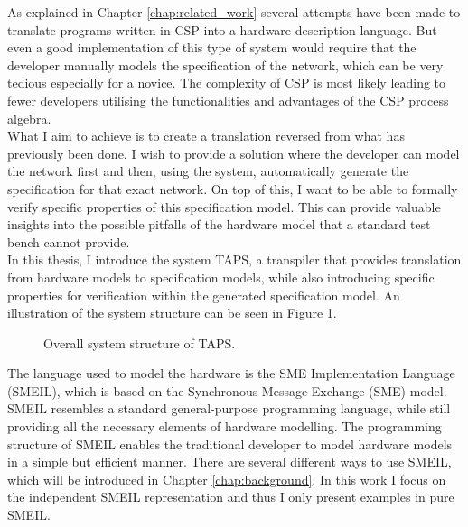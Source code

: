 As explained in Chapter \ref{chap:related_work} several attempts have been made to translate programs written in CSP into a hardware description language. But even a good implementation of this type of system would require that the developer manually models the specification of the \cspm{} network, which can be very tedious especially for a novice.
The complexity of CSP is most likely leading to fewer developers utilising the functionalities and advantages of the CSP process algebra.\\

What I aim to achieve is to create a translation reversed from what has previously been done. I wish to provide a solution where the developer can model the network first and then, using the system, automatically generate the specification for that exact network. On top of this, I want to be able to formally verify specific properties of this specification model. This can provide valuable insights into the possible pitfalls of the hardware model that a standard test bench cannot provide.\\

In this thesis, I introduce the system TAPS, a transpiler that provides translation from hardware models to specification models, while also introducing specific properties for verification within the generated specification model. An illustration of the system structure can be seen in Figure \ref{fig:simple_TAPS_network}.\\

\begin{figure}[!ht]
  \centering
  \caption{Overall system structure of TAPS.}
  \label{fig:simple_TAPS_network}
\end{figure}
The language used to model the hardware is the SME Implementation Language (SMEIL), which is based on the Synchronous Message Exchange (SME) model. SMEIL resembles a standard general-purpose programming language, while still providing all the necessary elements of hardware modelling. The programming structure of SMEIL enables the traditional developer to model hardware models in a simple but efficient manner. There are several different ways to use SMEIL, which will be introduced in Chapter \ref{chap:background}. In this work I focus on the independent SMEIL representation and thus I only present examples in pure SMEIL. \\\\


